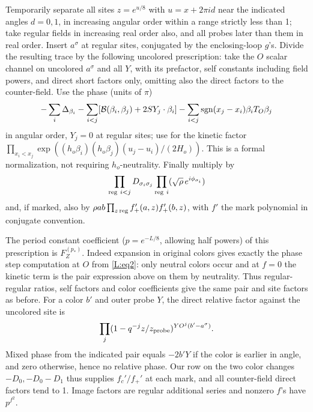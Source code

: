 Temporarily separate all sites \(z=e^{u/8}\) with \(u=x+2\pi i d\) near the indicated angles \(d=0,1\), in increasing angular order within a range strictly less than 1; take regular fields in increasing real order also, and all probes later than them in real order. Insert \(a^\sigma\) at regular sites, conjugated by the enclosing-loop \(g\)'s. Divide the resulting trace by the following uncolored prescription: take the \(O\) scalar channel on uncolored \(a^\sigma\) and all \(Y\), with its prefactor, self constants including field powers, and direct short factors only, omitting also the direct factors to the counter-field. Use the phase (units of \(\pi\))
\[
 -\sum_i\Delta_{\beta_i}-\sum_{i<j}[\mathcal B(\beta_i,\beta_j)+2SY_j\cdot\beta_i]
 -\sum_{i<j}{\rm sgn}(x_j-x_i)\beta_i T_O\beta_j
\]
in angular order, \(Y_j=0\) at regular sites; use for the kinetic factor
\(\prod_{x_i<x_j}\exp((h_o\beta_i)(h_o\beta_j)(u_j-u_i)/(2H_o))\).
This is a formal normalization, not requiring \(h_o\)-neutrality. Finally multiply by
\[
 \prod_{{\rm reg}\ i<j}D_{\sigma_i\sigma_j}
 \prod_{{\rm reg}\ i}(\sqrt\rho\,e^{i\phi_{\sigma_i}})
\]
and, if marked, also by \(\rho ab\prod_{z\,{\rm reg}} f_+'(a,z) f_+'(b,z)\), with \(f'\) the mark polynomial in conjugate convention.

The period constant coefficient (\(p=e^{-L/8}\), allowing half powers) of this prescription is \(F_Z^{(p_*)}\). Indeed expansion in original colors gives exactly the phase step computation at \(O\) from \eqref{L:eq2}: only neutral colors occur and at \(f=0\) the kinetic term is the pair expression above on them by neutrality. Thus regular-regular ratios, self factors and color coefficients give the same pair and site factors as before. For a color \(b'\) and outer probe \(Y\), the direct relative factor against the uncolored site is
\[
  \prod_j(1-q^{-j}z/z_{\rm probe})^{YO^j(b'-a^\sigma)}.
\]
Mixed phase from the indicated pair equals \(-2b'Y\) if the color is earlier in angle, and zero otherwise, hence no relative phase. Our row on the two color changes \(-D_0,-D_0-D_1\) thus supplies \(f_c'/f_+'\) at each mark, and all counter-field direct factors tend to 1. Image factors are regular additional series and nonzero \(f\)'s have \(p^{f^2}\).

